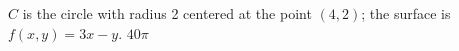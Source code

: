 {$C$ is the circle with radius 2 centered at the point $(4,2)$; the surface is $f(x,y)=3x-y$.
}
{$40\pi$
}
